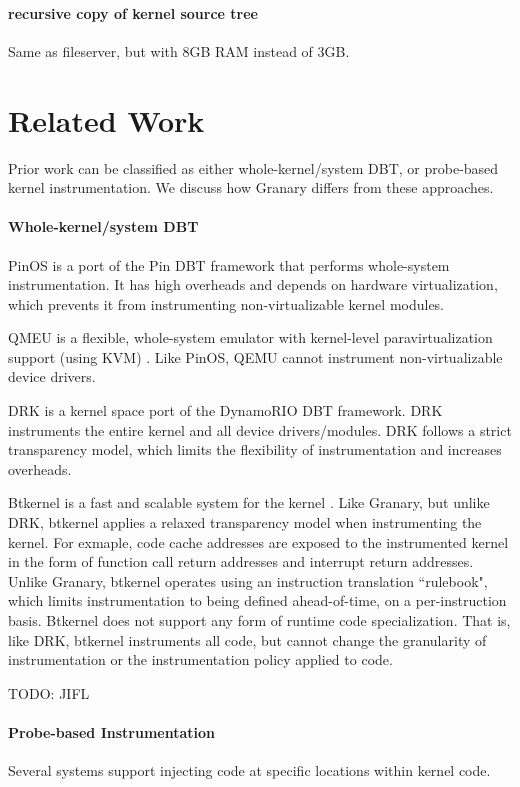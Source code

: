 \documentclass[preprint]{sigplanconf}
\begin{document}
\paragraph{recursive copy of kernel source tree}
Same as fileserver, but with 8GB RAM instead of 3GB.

\section{Related Work}\label{sec:related}
Prior work can be classified as either whole-kernel/system DBT, or probe-based kernel instrumentation. We discuss how Granary differs from these approaches.
\paragraph{Whole-kernel/system DBT}
PinOS \cite{PinOS} is a port of the Pin \cite{Pin} DBT framework that performs whole-system instrumentation. It has high overheads and depends on hardware virtualization, which prevents it from instrumenting non-virtualizable kernel modules. 

QMEU is a flexible, whole-system emulator with kernel-level paravirtualization support (using KVM) \cite{QEMU}. Like PinOS, QEMU cannot instrument non-virtualizable device drivers.

DRK \cite{DRK} is a kernel space port of the DynamoRIO \cite{DynamoRIO} DBT framework. DRK instruments the entire kernel and all device drivers/modules. DRK follows a strict transparency model, which limits the flexibility of instrumentation and increases overheads. 

Btkernel is a fast and scalable system for the kernel \cite{btkernel}. Like Granary, but unlike DRK, btkernel applies a relaxed transparency model when instrumenting the kernel. For exmaple, code cache addresses are exposed to the instrumented kernel in the form of function call return addresses and interrupt return addresses. Unlike Granary, btkernel operates using an instruction translation ``rulebook", which limits instrumentation to being defined ahead-of-time, on a per-instruction basis. Btkernel does not support any form of runtime code specialization. That is, like DRK, btkernel instruments all code, but cannot change the granularity of instrumentation or the instrumentation policy applied to code.

TODO: JIFL

\paragraph{Probe-based Instrumentation} Several systems support injecting code at specific locations within kernel code.
\end{document}
